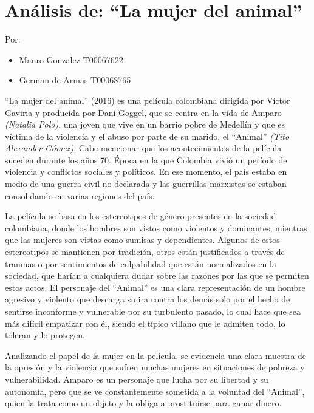 \documentclass[letterpaper, 12pt]{report}
\begin{document}
\chapter*{Análisis de: ``La mujer del animal''}

\noindent\makebox[\linewidth]{\rule{\textwidth}{0.4pt}}

Por:
\begin{itemize}[label=$\triangleright$]
    \item Mauro Gonzalez T00067622
    \item German de Armas T00068765
\end{itemize}

\noindent\makebox[\linewidth]{\rule{\textwidth}{0.4pt}}

\nocite{Pelicula}

``La mujer del animal'' (2016) es una película colombiana dirigida por Víctor Gaviria y
producida por Dani Goggel, que se centra en la vida de Amparo
\textit{(Natalia Polo)}, una joven que vive en un barrio pobre de Medellín
y que es víctima de la violencia y el abuso por parte de su marido, el
``Animal'' \textit{(Tito Alexander Gómez)}. Cabe mencionar que los
acontecimientos de la película suceden durante los años 70. Época en la que
Colombia vivió un período de violencia y conflictos sociales y políticos.
En ese momento, el país estaba en medio de una guerra civil no declarada y
las guerrillas marxistas se estaban consolidando en varias regiones del país.

La película se basa en los estereotipos de género presentes
en la sociedad colombiana, donde los hombres son vistos
como violentos y dominantes, mientras que las mujeres son
vistas como sumisas y dependientes. Algunos de estos
estereotipos se mantienen por tradición, otros están
justificados a través de traumas o por sentimientos de
culpabilidad que están normalizados en la sociedad, que
harían a cualquiera dudar sobre las razones por las que se
permiten estos actos. El personaje del ``Animal'' es una
clara representación de un hombre agresivo y violento que
descarga su ira contra los demás solo por el hecho de
sentirse inconforme y vulnerable por su turbulento pasado,
lo cual hace que sea más difícil empatizar con él, siendo
el típico villano que le admiten todo, lo toleran y lo
protegen.

Analizando el papel de la mujer en la película, se
evidencia una clara muestra de la opresión y la violencia
que sufren muchas mujeres en situaciones de pobreza y
vulnerabilidad. Amparo es un personaje que lucha por su
libertad y su autonomía, pero que se ve constantemente
sometida a la voluntad del ``Animal'', quien la trata como
un objeto y la obliga a prostituirse para ganar dinero.
\end{document}
